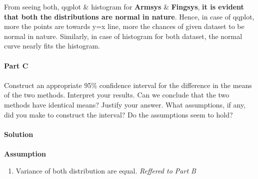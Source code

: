 \documentclass[12pt,a4paper]{report}
\begin{document}
\newpage
From seeing both, qqplot \& histogram for \textbf{Armsys} \& \textbf{Fingsys}, \textbf{it is evident that both the distributions are normal in nature}. Hence, in case of qqplot, more the points are towards y=x line, more the chances of given dataset to be normal in nature. Similarly, in case of histogram for both dataset, the normal curve nearly fits the histogram.
\\\\
\textbf{Part C}
\\\\
Construct an appropriate 95\% confidence interval for the difference in the means of the two methods. Interpret your results. Can we conclude that the two methods have identical means? Justify your answer. What assumptions, if any, did you make to construct the interval? Do the assumptions seem to hold?
\\\\
\textbf{Solution}
\\\\
\textbf{Assumption}
\begin{enumerate}
\item Variance of both distribution are equal.  \textit{Reffered to Part B}
\end{enumerate}
\end{document}
